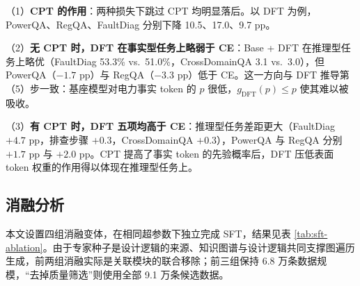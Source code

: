 \documentclass[fontset=fandol,type=master,campus=shenzhen,etitleauto=true]{hithesisbook}
\begin{document}
\begin{table}[htbp]
\centering
\caption{初始化基座（Base vs.\ CPT）与微调目标（Standard CE vs.\ DFT）的 $2 \times 2$ 对比结果}
\label{tab:cpt-dft-synergy}
\small
\setlength{\tabcolsep}{4pt}
\renewcommand{\arraystretch}{1.15}
\end{table}

（1）\textbf{CPT 的作用}：两种损失下跳过 CPT 均明显落后。以 DFT 为例，PowerQA、RegQA、FaultDiag 分别下降 10.5、17.0、9.7 pp。

（2）\textbf{无 CPT 时，DFT 在事实型任务上略弱于 CE}：Base + DFT 在推理型任务上略优（FaultDiag 53.3\% vs.\ 51.0\%，CrossDomainQA 3.1 vs.\ 3.0），但 PowerQA（$-1.7$ pp）与 RegQA（$-3.3$ pp）低于 CE。这一方向与 DFT 推导第（5）步一致：基座模型对电力事实 token 的 $p$ 很低，$g_{\text{DFT}}(p) \le p$ 使其难以被吸收。

（3）\textbf{有 CPT 时，DFT 五项均高于 CE}：推理型任务差距更大（FaultDiag $+4.7$ pp，排查步骤 $+0.3$，CrossDomainQA $+0.3$），PowerQA 与 RegQA 分别 $+1.7$ pp 与 $+2.0$ pp。CPT 提高了事实 token 的先验概率后，DFT 压低表面 token 权重的作用得以体现在推理型任务上。

\subsection{消融分析}\label{ux6d88ux878dux5206ux6790}

本文设置四组消融变体，在相同超参数下独立完成 SFT，结果见表 \ref{tab:sft-ablation}。由于专家种子是设计逻辑的来源、知识图谱与设计逻辑共同支撑图遍历生成，前两组消融实际是关联模块的联合移除；前三组保持 6.8 万条数据规模，“去掉质量筛选”则使用全部 9.1 万条候选数据。
\end{document}

